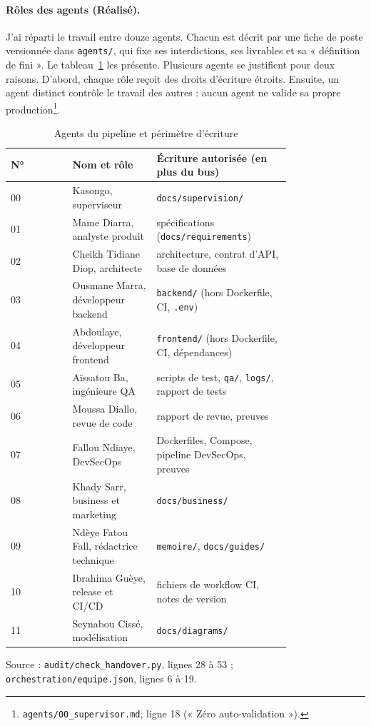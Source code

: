 \paragraph{Rôles des agents (Réalisé).} J'ai réparti le travail entre douze agents. Chacun est décrit par une fiche de poste versionnée dans \nolinkurl{agents/}, qui fixe ses interdictions, ses livrables et sa « définition de fini ». Le tableau~\ref{tab:agents} les présente. Plusieurs agents se justifient pour deux raisons. D'abord, chaque rôle reçoit des droits d'écriture étroits. Ensuite, un agent distinct contrôle le travail des autres : aucun agent ne valide sa propre production\footnote{\nolinkurl{agents/00_supervisor.md}, ligne 18 (« Zéro auto-validation »).}.

\begin{table}[htbp]
  \centering
  \small
  \caption{Agents du pipeline et périmètre d'écriture}
  \label{tab:agents}
  \begin{tabular}{@{}l>{\raggedright\arraybackslash}p{0.30\linewidth}>{\raggedright\arraybackslash}p{0.48\linewidth}@{}}
    \toprule
    \textbf{N°} & \textbf{Nom et rôle} & \textbf{Écriture autorisée (en plus du bus)} \\
    \midrule
    00 & Kasongo, superviseur & \texttt{docs/supervision/} \\
    01 & Mame Diarra, analyste produit & spécifications (\texttt{docs/requirements}) \\
    02 & Cheikh Tidiane Diop, architecte & architecture, contrat d'API, base de données \\
    03 & Ousmane Marra, développeur backend & \texttt{backend/} (hors Dockerfile, CI, \texttt{.env}) \\
    04 & Abdoulaye, développeur frontend & \texttt{frontend/} (hors Dockerfile, CI, dépendances) \\
    05 & Aïssatou Ba, ingénieure QA & scripts de test, \texttt{qa/}, \texttt{logs/}, rapport de tests \\
    06 & Moussa Diallo, revue de code & rapport de revue, preuves \\
    07 & Fallou Ndiaye, DevSecOps & Dockerfiles, Compose, pipeline DevSecOps, preuves \\
    08 & Khady Sarr, business et marketing & \texttt{docs/business/} \\
    09 & Ndèye Fatou Fall, rédactrice technique & \texttt{memoire/}, \texttt{docs/guides/} \\
    10 & Ibrahima Guèye, release et CI/CD & fichiers de workflow CI, notes de version \\
    11 & Seynabou Cissé, modélisation & \texttt{docs/diagrams/} \\
    \bottomrule
  \end{tabular}

  \smallskip
  {\footnotesize Source : \nolinkurl{audit/check_handover.py}, lignes 28 à 53 ; \nolinkurl{orchestration/equipe.json}, lignes 6 à 19.}
\end{table}

